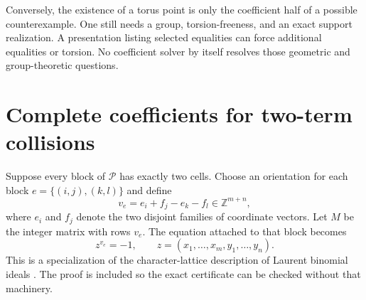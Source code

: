 \documentclass[11pt,a4paper,oneside]{report}
\theoremstyle{definition}
\theoremstyle{remark}
\newcommand{\Z}{\mathbb Z}
\begin{document}
Conversely, the existence of a torus point is only the coefficient half
of a possible counterexample. One still needs a group, torsion-freeness,
and an exact support realization. A presentation listing selected
equalities can force additional equalities or torsion. No coefficient
solver by itself resolves those geometric and group-theoretic questions.

\section{Complete coefficients for two-term collisions}\label{M01:sec:pairs}

Suppose every block of $\mathcal P$ has exactly two cells. Choose an
orientation for each block $e=\{(i,j),(k,l)\}$ and define
\[
v_e=e_i+f_j-e_k-f_l\in\Z^{m+n},
\]
where $e_i$ and $f_j$ denote the two disjoint families of coordinate
vectors. Let $M$ be the integer matrix with rows $v_e$.
The equation attached to that block becomes
\begin{equation}\label{M01:eq:binomial}
z^{v_e}=-1,\qquad z=(x_1,\ldots,x_m,y_1,\ldots,y_n).
\end{equation}
This is a specialization of the character-lattice description of Laurent
binomial ideals \cite[Theorem 2.1]{B:ES}. The proof is included so the exact
certificate can be checked without that machinery.
\end{document}
